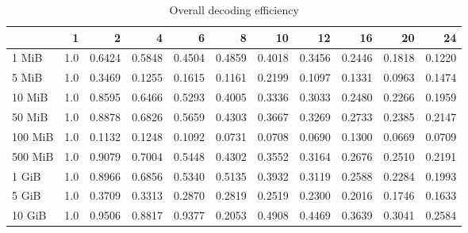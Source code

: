 \begin{table}[!h]
	\caption{Overall decoding efficiency}
\begin{tabular}{lrrrrrrrrrr}
	\toprule
		\diagbox{File sizes }{Threads}  &   1  &      2  &      4  &      6  &      8  &      10 &      12 &      16 &      20 &      24 \\
	\midrule
	1 MiB   &  1.0 &  0.6424 &  0.5848 &  0.4504 &  0.4859 &  0.4018 &  0.3456 &  0.2446 &  0.1818 &  0.1220 \\
	5 MiB   &  1.0 &  0.3469 &  0.1255 &  0.1615 &  0.1161 &  0.2199 &  0.1097 &  0.1331 &  0.0963 &  0.1474 \\
	10 MiB  &  1.0 &  0.8595 &  0.6466 &  0.5293 &  0.4005 &  0.3336 &  0.3033 &  0.2480 &  0.2266 &  0.1959 \\
	50 MiB  &  1.0 &  0.8878 &  0.6826 &  0.5659 &  0.4303 &  0.3667 &  0.3269 &  0.2733 &  0.2385 &  0.2147 \\
	100 MiB &  1.0 &  0.1132 &  0.1248 &  0.1092 &  0.0731 &  0.0708 &  0.0690 &  0.1300 &  0.0669 &  0.0709 \\
	500 MiB &  1.0 &  0.9079 &  0.7004 &  0.5448 &  0.4302 &  0.3552 &  0.3164 &  0.2676 &  0.2510 &  0.2191 \\
	1 GiB   &  1.0 &  0.8966 &  0.6856 &  0.5340 &  0.5135 &  0.3932 &  0.3119 &  0.2588 &  0.2284 &  0.1993 \\
	5 GiB   &  1.0 &  0.3709 &  0.3313 &  0.2870 &  0.2819 &  0.2519 &  0.2300 &  0.2016 &  0.1746 &  0.1633 \\
	10 GiB  &  1.0 &  0.9506 &  0.8817 &  0.9377 &  0.2053 &  0.4908 &  0.4469 &  0.3639 &  0.3041 &  0.2584 \\
	\bottomrule
\end{tabular}
\end{table}

